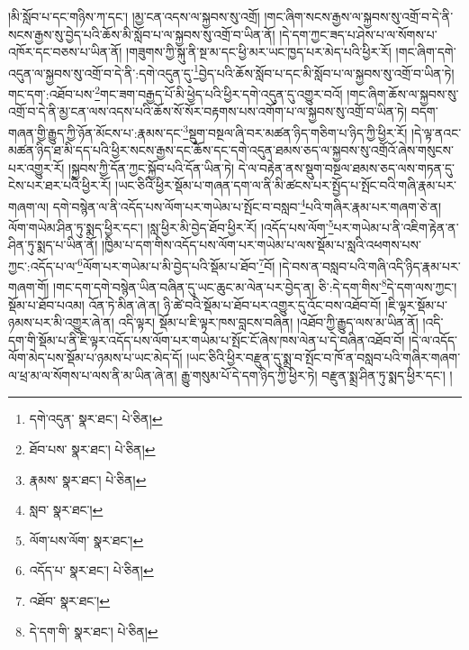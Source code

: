 །མི་སློབ་པ་དང་གཉིས་ཀ་དང་། །མྱ་ངན་འདས་ལ་སྐྱབས་སུ་འགྲོ། །གང་ཞིག་སངས་རྒྱས་ལ་སྐྱབས་སུ་འགྲོ་བ་དེ་ནི་སངས་རྒྱས་སུ་བྱེད་པའི་ཆོས་མི་སློབ་པ་ལ་སྐྱབས་སུ་འགྲོ་བ་ཡིན་ནོ། །དེ་དག་ཀྱང་ཟད་པ་ཤེས་པ་ལ་སོགས་པ་འཁོར་དང་བཅས་པ་ཡིན་ནོ། །གཟུགས་ཀྱི་སྐུ་ནི་སྔ་མ་དང་ཕྱི་མར་ཡང་ཁྱད་པར་མེད་པའི་ཕྱིར་རོ། །གང་ཞིག་དགེ་འདུན་ལ་སྐྱབས་སུ་འགྲོ་བ་དེ་ནི་:དགེ་འདུན་དུ་\footnote{དགེ་འདུན་  སྣར་ཐང་།  པེ་ཅིན། }བྱེད་པའི་ཆོས་སློབ་པ་དང་མི་སློབ་པ་ལ་སྐྱབས་སུ་འགྲོ་བ་ཡིན་ཏེ། གང་དག་:འཐོབ་པས་\footnote{ཐོབ་པས་  སྣར་ཐང་།  པེ་ཅིན། }གང་ཟག་བརྒྱད་པོ་མི་ཕྱེད་པའི་ཕྱིར་དགེ་འདུན་དུ་འགྱུར་བའོ། །གང་ཞིག་ཆོས་ལ་སྐྱབས་སུ་འགྲོ་བ་དེ་ནི་མྱ་ངན་ལས་འདས་པའི་ཆོས་སོ་སོར་བརྟགས་པས་འགོག་པ་ལ་སྐྱབས་སུ་འགྲོ་བ་ཡིན་ཏེ། བདག་གཞན་གྱི་རྒྱུད་ཀྱི་ཉོན་མོངས་པ་:རྣམས་དང་\footnote{རྣམས་  སྣར་ཐང་།  པེ་ཅིན། }སྡུག་བསྔལ་ཞི་བར་མཚན་ཉིད་གཅིག་པ་ཉིད་ཀྱི་ཕྱིར་རོ། །དེ་ལྟ་ནའང་མཚན་ཉིད་ཐ་མི་དད་པའི་ཕྱིར་སངས་རྒྱས་དང་ཆོས་དང་དགེ་འདུན་ཐམས་ཅད་ལ་སྐྱབས་སུ་འགྲོའོ་ཞེས་གསུངས་པར་འགྱུར་རོ། །སྐྱབས་ཀྱི་དོན་ཀྱང་སྐྱོབ་པའི་དོན་ཡིན་ཏེ། དེ་ལ་བརྟེན་ནས་སྡུག་བསྔལ་ཐམས་ཅད་ལས་གཏན་དུ་ངེས་པར་ཐར་པའི་ཕྱིར་རོ། །ཡང་ཅིའི་ཕྱིར་སྡོམ་པ་གཞན་དག་ལ་ནི་མི་ཚངས་པར་སྤྱོད་པ་སྤོང་བའི་གཞི་རྣམ་པར་གཞག་ལ། དགེ་བསྙེན་ལ་ནི་འདོད་པས་ལོག་པར་གཡེམ་པ་སྤོང་བ་བསླབ་\footnote{སླབ་  སྣར་ཐང་། }པའི་གཞིར་རྣམ་པར་གཞག་ཅེ་ན། ལོག་གཡེམ་ཤིན་ཏུ་སྨད་ཕྱིར་དང་། །སླ་ཕྱིར་མི་བྱེད་ཐོབ་ཕྱིར་རོ། །འདོད་པས་ལོག་\footnote{ལོག་པས་ལོག་  སྣར་ཐང་། }པར་གཡེམ་པ་ནི་འཇིག་རྟེན་ན་ཤིན་ཏུ་སྨད་པ་ཡིན་ནོ། །ཁྱིམ་པ་དག་གིས་འདོད་པས་ལོག་པར་གཡེམ་པ་ལས་སྡོམ་པ་སླའི་འཕགས་པས་ཀྱང་:འདོད་པ་ལ་\footnote{འདོད་པ་  སྣར་ཐང་།  པེ་ཅིན། }ལོག་པར་གཡེམ་པ་མི་བྱེད་པའི་སྡོམ་པ་ཐོབ་\footnote{འཐོབ་  སྣར་ཐང་། }བོ། །དེ་བས་ན་བསླབ་པའི་གཞི་འདི་ཉིད་རྣམ་པར་གཞག་གོ། །གང་དག་དགེ་བསྙེན་ཡིན་བཞིན་དུ་ཡང་ཆུང་མ་ལེན་པར་བྱེད་ན། ཅི་:དེ་དག་གིས་\footnote{དེ་དག་གི་  སྣར་ཐང་།  པེ་ཅིན། }དེ་དག་ལས་ཀྱང་། སྡོམ་པ་ཐོབ་པའམ། འོན་ཏེ་མིན་ཞེ་ན། ཉི་ཚེ་བའི་སྡོམ་པ་ཐོབ་པར་འགྱུར་དུ་འོང་བས་འཐོབ་བོ། །ཇི་ལྟར་སྡོམ་པ་ཉམས་པར་མི་འགྱུར་ཞེ་ན། འདི་ལྟར། སྡོམ་པ་ཇི་ལྟར་ཁས་བླངས་བཞིན། །འཐོབ་ཀྱི་རྒྱུད་ལས་མ་ཡིན་ནོ། །འདི་དག་གི་སྡོམ་པ་ནི་ཇི་ལྟར་འདོད་པས་ལོག་པར་གཡེམ་པ་སྤོང་ངོ་ཞེས་ཁས་ལེན་པ་དེ་བཞིན་འཐོབ་བོ། །དེ་ལ་འདོད་ལོག་མེད་པས་སྡོམ་པ་ཉམས་པ་ཡང་མེད་དོ། །ཡང་ཅིའི་ཕྱིར་བརྫུན་དུ་སྨྲ་བ་སྤོང་བ་ཁོ་ན་བསླབ་པའི་གཞིར་གཞག་ལ་ཕྲ་མ་ལ་སོགས་པ་ལས་ནི་མ་ཡིན་ཞེ་ན། རྒྱུ་གསུམ་པོ་དེ་དག་ཉིད་ཀྱི་ཕྱིར་ཏེ། བརྫུན་སྨྲ་ཤིན་ཏུ་སྨད་ཕྱིར་དང་། །

